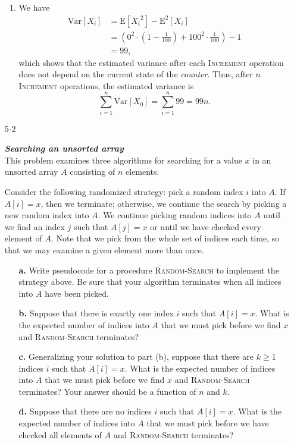 \documentclass{report}
\makeatletter
\renewenvironment{framed}{%
 \def\FrameCommand##1{\hskip\@totalleftmargin
 \fboxsep=\FrameSep\fbox{##1}}%
 \MakeFramed {\advance\hsize-\width
   \@totalleftmargin\z@ \linewidth\hsize
   \@setminipage}}%
 {\par\unskip\endMakeFramed}
\makeatother
\begin{document}
\begin{enumerate}
\begin{framed}
\begin{enumerate}
\item We have
\begin{equation*}
\begin{aligned}
  \text{Var}[X_i] &= \text{E}[{X_i}^2] - \text{E}^2[X_i]\\
                  &= \left( 0^2 \cdot \left(1 - \frac{1}{100}\right) + 100^2 \cdot \frac{1}{100} \right) - 1\\
                  &= 99,
\end{aligned}
\end{equation*}
which shows that the estimated variance after each \textsc{Increment} operation
does not depend on the current state of the \emph{counter}. Thus, after $n$
\textsc{Increment} operations, the
estimated variance is
\[
  \sum_{i = 1}^{n} \text{Var}[X_0] = \sum_{i = 1}^{n} 99 = 99n.
\]
\end{enumerate}
\end{framed}

\newpage

\item[5{-}2]{\textbf{\emph{Searching an unsorted array}}\\
This problem examines three algorithms for searching for a value $x$ in an
unsorted array $A$ consisting of $n$ elements.

Consider the following randomized strategy: pick a random index $i$ into $A$. If
$A[i] = x$, then we terminate; otherwise, we continue the search by picking
a new random index into $A$. We continue picking random indices into $A$ until
we find an index $j$ such that $A[j] = x$ or until we have checked every element
of $A$. Note that we pick from the whole set of indices each time, so that we
may examine a given element more than once.

\begin{enumerate}
\item[\textbf{a.}] Write pseudocode for a procedure \textsc{Random-Search} to
implement the strategy above. Be sure that your algorithm terminates when all
indices into $A$ have been picked.
\item[\textbf{b.}] Suppose that there is exactly one index $i$ such that
$A[i] = x$. What is the expected number of indices into $A$ that we must pick
before we find $x$ and \textsc{Random-Search} terminates?
\item[\textbf{c.}] Generalizing your solution to part (b), suppose that there
are $k \ge 1$ indices $i$ such that $A[i] = x$. What is the expected number of
indices into $A$ that we must pick before we find $x$ and \textsc{Random-Search}
terminates? Your answer should be a function of $n$ and $k$.
\item[\textbf{d.}] Suppose that there are no indices $i$ such that $A[i] = x$.
What is the expected number of indices into $A$ that we must pick before we
have checked all elements of $A$ and \textsc{Random-Search} terminates?
\end{enumerate}

}
\end{enumerate}
\end{document}
